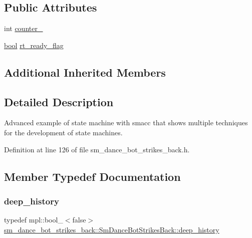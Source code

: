 \subsection*{Public Attributes}
\begin{DoxyCompactItemize}
\item 
int \hyperlink{structsm__dance__bot__strikes__back_1_1SmDanceBotStrikesBack_a0cf56e316022dde4b3da552ab9f68513}{counter\+\_}
\item 
\hyperlink{classbool}{bool} \hyperlink{structsm__dance__bot__strikes__back_1_1SmDanceBotStrikesBack_a609265a94c2575580fbb014f551a066a}{rt\+\_\+ready\+\_\+flag}
\end{DoxyCompactItemize}
\subsection*{Additional Inherited Members}


\subsection{Detailed Description}
Advanced example of state machine with smacc that shows multiple techniques for the development of state machines. 

Definition at line 126 of file sm\+\_\+dance\+\_\+bot\+\_\+strikes\+\_\+back.\+h.



\subsection{Member Typedef Documentation}
\mbox{\label{structsm__dance__bot__strikes__back_1_1SmDanceBotStrikesBack_a3192d4079cbcf0739c7002538767ad22}} 
\subsubsection{\texorpdfstring{deep\+\_\+history}{deep\_history}}
{\footnotesize\ttfamily typedef mpl\+::bool\+\_\+$<$false$>$ \hyperlink{structsm__dance__bot__strikes__back_1_1SmDanceBotStrikesBack_a3192d4079cbcf0739c7002538767ad22}{sm\+\_\+dance\+\_\+bot\+\_\+strikes\+\_\+back\+::\+Sm\+Dance\+Bot\+Strikes\+Back\+::deep\+\_\+history}}




